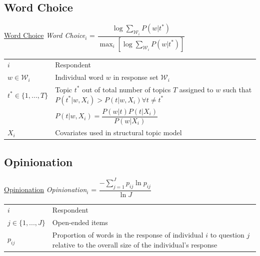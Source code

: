 \subsection{Word Choice}
\begin{frame}{\hyperlink{components}{Word Choice}}\label{eloquence}\centering
\emph{Word Choice$_i$} = $\dfrac{\log\sum_{\mathcal{W}_i} P(w|t^*)}{\max_i\left[\log\sum_{\mathcal{W}_i} P(w|t^*)\right]}$
\vspace{1em}\\
\begin{tabular}{lp{8.5cm}}
\toprule
$i$ & Respondent \\
$w \in \mathcal{W}_i$ & Individual word $w$ in response set $\mathcal{W}_i$\\
$t^* \in \{1,...,T\} $ & Topic $t^*$ out of total number of topics $T$ assigned to $w$ such that $P(t^*|w,X_i) > P(t|w,X_i) \forall t\neq t^*$\\
& $P(t|w,X_i)=\dfrac{P(w|t)P(t|X_i)}{P(w|X_i)}$ \\
$X_i$ & Covariates used in structural topic model
\end{tabular}
\end{frame}

\subsection{Opinionation}
\begin{frame}{\hyperlink{components}{Opinionation}}\label{opinionation}\centering
\emph{Opinionation$_i$} = $\dfrac{-\sum_{j=1}^J p_{ij} \ln p_{ij}}{\ln J}$
\vspace{1em}\\
\begin{tabular}{lp{9cm}}
\toprule
$i$ & Respondent \\
$j \in \{1,...,J\}$ & Open-ended items \\
$p_{ij}$ & Proportion of words in the response of individual $i$ to question $j$ relative to the overall size of the individual's response\\
\end{tabular}
\end{frame}


